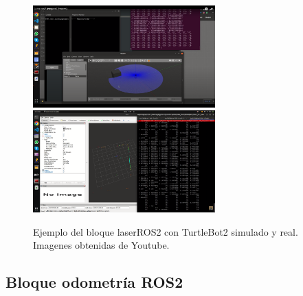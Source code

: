 \begin{figure} [H]
    \begin{center}
      \includegraphics[width=7cm]{figs/c4/laserS.png}
      \includegraphics[width=7cm]{figs/c4/laserR.png}
    \end{center}
    \caption[Ejemplo bloque láser ROS2]{Ejemplo del bloque laserROS2 con TurtleBot2 simulado y real. Imagenes obtenidas de Youtube\footnotemark.}
    \label{fig:vid_laserR}
\end{figure}

\newpage

\subsection{Bloque odometría ROS2}
\label{subsec:odomROS2}

